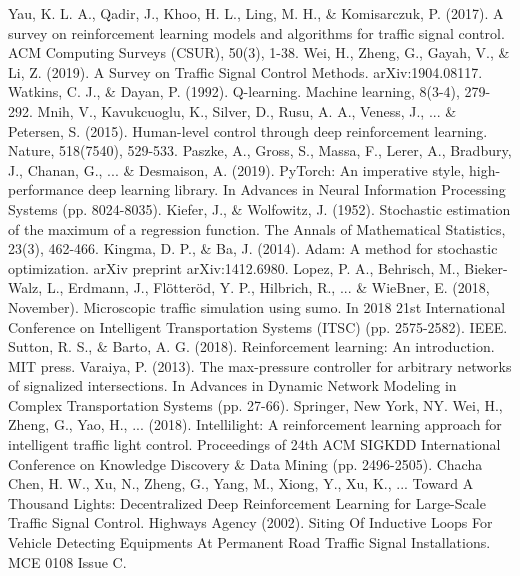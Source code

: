 \documentclass[conference]{IEEEtran}
\begin{document}
\begin{thebibliography}{00}
 Yau, K. L. A., Qadir, J., Khoo, H. L., Ling, M. H., \& Komisarczuk, P. (2017). A survey on reinforcement learning models and algorithms for traffic signal control. ACM Computing Surveys (CSUR), 50(3), 1-38.
 Wei, H., Zheng, G., Gayah, V., \& Li, Z. (2019). A Survey on Traffic Signal Control Methods. arXiv:1904.08117.
 Watkins, C. J., \& Dayan, P. (1992). Q-learning. Machine learning, 8(3-4), 279-292.
 Mnih, V., Kavukcuoglu, K., Silver, D., Rusu, A. A., Veness, J.,  ... \& Petersen, S. (2015). Human-level control through deep reinforcement learning. Nature, 518(7540), 529-533.
 Paszke, A., Gross, S., Massa, F., Lerer, A., Bradbury, J., Chanan, G., ... \& Desmaison, A. (2019). PyTorch: An imperative style, high-performance deep learning library. In Advances in Neural Information Processing Systems (pp. 8024-8035).
 Kiefer, J., \& Wolfowitz, J. (1952). Stochastic estimation of the maximum of a regression function. The Annals of Mathematical Statistics, 23(3), 462-466.
 Kingma, D. P., \& Ba, J. (2014). Adam: A method for stochastic optimization. arXiv preprint arXiv:1412.6980.
 Lopez, P. A., Behrisch, M., Bieker-Walz, L., Erdmann, J., Flötteröd, Y. P., Hilbrich, R., ... \& WieBner, E. (2018, November). Microscopic traffic simulation using sumo. In 2018 21st International Conference on Intelligent Transportation Systems (ITSC) (pp. 2575-2582). IEEE.
 Sutton, R. S., \& Barto, A. G. (2018). Reinforcement learning: An introduction. MIT press.
 Varaiya, P. (2013). The max-pressure controller for arbitrary networks of signalized intersections. In Advances in Dynamic Network Modeling in Complex Transportation Systems (pp. 27-66). Springer, New York, NY.
 Wei, H., Zheng, G., Yao, H., ... (2018). Intellilight: A reinforcement learning approach for intelligent traffic light control. Proceedings of  24th ACM SIGKDD International Conference on Knowledge Discovery \& Data Mining (pp. 2496-2505).
 Chacha Chen, H. W., Xu, N., Zheng, G., Yang, M., Xiong, Y., Xu, K., ... Toward A Thousand Lights: Decentralized Deep Reinforcement Learning for Large-Scale Traffic Signal Control.
 Highways Agency (2002). Siting Of Inductive Loops For Vehicle Detecting Equipments At Permanent Road Traffic Signal Installations. MCE 0108 Issue C.
\end{thebibliography}
\end{document}
